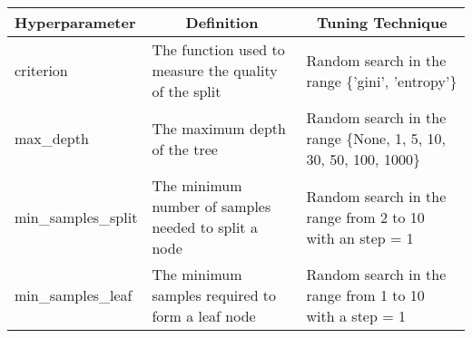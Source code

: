 \begin{table}[H]
\centering
\begin{tabularx}{0.8\textwidth}{l|X|X}
\hline
\textbf{Hyperparameter} & \multicolumn{1}{c|}{\textbf{Definition}}              & \multicolumn{1}{c}{\textbf{Tuning Technique}}                   \\ \hline
criterion               & The function used to measure the quality of the split & Random search in the range \{'gini', 'entropy'\}                 \\ \hline
max\_depth              & The maximum depth of the tree                         & Random search in the range \{None, 1, 5, 10, 30, 50, 100, 1000\} \\ \hline
min\_samples\_split     & The minimum number of samples needed to split a node  & Random search in the range from 2 to 10 with an step = 1         \\ \hline
min\_samples\_leaf      & The minimum samples required to form a leaf node      & Random search in the range from 1 to 10 with a step = 1          \\ \hline
\end{tabularx}
\end{table}